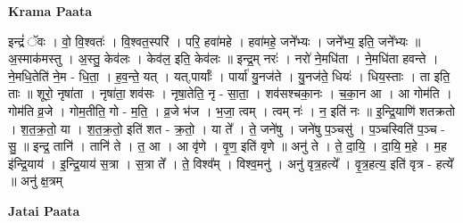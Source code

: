 \documentclass[17pt]{extarticle}
\begin{document}
\textbf{Krama Paata} \newline

इन्द्रं॑ ॅवः । वो॒ वि॒श्वतः॑ । वि॒श्वत॒स्परि॑ । परि॒ हवा॑महे । हवा॑महे॒ जने᳚भ्यः । जने᳚भ्य॒ इति॒ जने᳚भ्यः ॥ अ॒स्माक॑मस्तु । अ॒स्तु॒ केव॑लः । केव॑ल॒ इति॒ केव॑लः ॥ इन्द्र॒म् नरः॑ । नरो॑ ने॒मधि॑ता । ने॒मधि॑ता हवन्ते । ने॒मधि॒तेति॑ ने॒म - धि॒ता॒ । ह॒व॒न्ते॒ यत् । यत्,पार्याः᳚ । पार्या॑ यु॒नज॑ते । यु॒नज॑ते॒ धियः॑ । धिय॒स्ताः । ता इति॒ ताः ॥ शूरो॒ नृषा॑ता । नृषा॑ता॒ शव॑सः । नृषा॒तेति॒ नृ - सा॒ता॒ । शव॑सश्चका॒नः । च॒का॒न आ । आ गोम॑ति । गोम॑ति व्र॒जे । गोम॒तीति॒ गो - म॒ति॒ । व्र॒जे भ॑ज । भ॒जा॒ त्वम् । त्वम् नः॑ । न॒ इति॑ नः ॥ इ॒न्द्रि॒याणि॑ शतक्रतो । श॒त॒क्र॒तो॒ या । श॒त॒क्र॒तो॒ इति॑ शत - क्र॒तो॒ । या ते᳚ । ते॒ जने॑षु । जने॑षु प॒ञ्चसु॑ । प॒ञ्चस्विति॑ प॒ञ्च - सु॒ ॥ इन्द्र॒ तानि॑ । तानि॑ ते । त॒ आ । आ वृ॑णे । वृ॒ण॒ इति॑ वृणे ॥ अनु॑ ते । ते॒ दा॒यि॒ । दा॒यि॒ म॒हे । म॒ह इ॑न्द्रि॒याय॑ । इ॒न्द्रि॒याय॑ स॒त्रा । स॒त्रा ते᳚ । ते॒ विश्व᳚म् । विश्व॒मनु॑ । अनु॑ वृत्र॒हत्ये᳚ । वृ॒त्र॒हत्य॒ इति॑ वृत्र - हत्ये᳚ ॥ अनु॑ क्ष॒त्रम् \newline

\textbf{Jatai Paata} \newline
\end{document}
